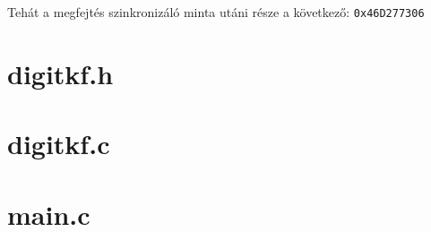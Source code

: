 		Tehát a megfejtés szinkronizáló minta utáni része a következő: \verb|0x46D277306|


%
\clearpage
\appendix
%
\section{digitkf.h}
		
\section{digitkf.c}
		
\section{main.c}
		
%





